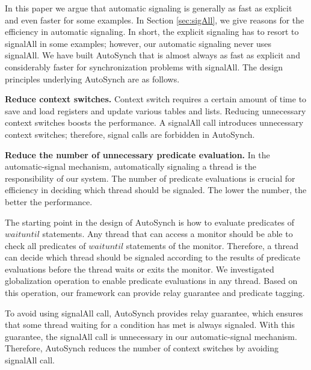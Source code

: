 \documentclass[preprint]{sigplanconf}
\begin{document}
In this paper we argue that automatic signaling is generally as fast as explicit 
and even faster for some examples. In Section \ref{sec:sigAll}, we give reasons
for the efficiency in automatic signaling. In short, the explicit signaling has 
to resort to signalAll in some examples; however, our automatic signaling never 
uses signalAll. We have built AutoSynch that is almost always as 
fast as explicit and considerably faster for synchronization problems with 
signalAll. The design principles underlying AutoSynch are as follows.

\begin{description}
    \item{\bf Reduce context switches.} Context switch requires a certain 
        amount of time to save and load registers and update various tables and
        lists. Reducing unnecessary context switches boosts the performance.
        A signalAll call introduces unnecessary context switches; therefore,
        signal calls are forbidden in AutoSynch. 
    \item {\bf Reduce the number of unnecessary predicate evaluation.} In the 
        automatic-signal mechanism, automatically signaling a thread is the 
        responsibility of our system. The number of predicate evaluations is 
        crucial for efficiency in deciding which thread should be signaled. The
        lower the number, the better the performance.
\end{description}


The starting point in the design of AutoSynch is how to evaluate predicates of
$waituntil$ statements. Any thread that can access a monitor should be able
to check all predicates of $waituntil$ statements of the monitor. Therefore, a 
thread can decide which thread should be signaled according to the results of
predicate evaluations before the thread waits or exits the monitor. We 
investigated globalization operation to enable predicate evaluations in any 
thread. Based on this operation, our framework can provide relay guarantee and 
predicate tagging. 

To avoid using signalAll call, AutoSynch 
provides relay guarantee, which ensures that some thread waiting for a
condition has met is always signaled. With this guarantee, the signalAll call 
is unnecessary in our automatic-signal mechanism. Therefore, AutoSynch reduces 
the number of context switches by avoiding signalAll call. 
\end{document}
